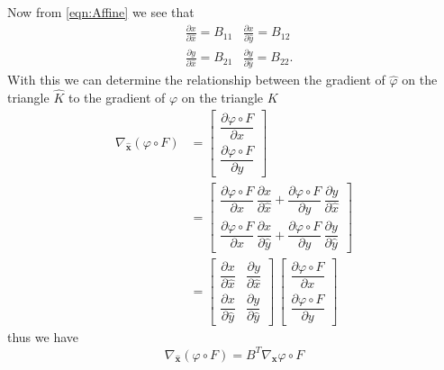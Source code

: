 Now from \eqref{eqn:Affine} we see that
\begin{align*}
  &\frac{\partial x}{\partial \hat{x}} = B_{11}   &\frac{\partial x}{\partial \hat{y}} = B_{12} \\
  &\frac{\partial y}{\partial \hat{x}} = B_{21}   &\frac{\partial y}{\partial
    \hat{y}} = B_{22}.
\end{align*}
With this we can determine the relationship between the gradient of $\hat{\varphi}$ on the
triangle $\hat{K}$ to the gradient of $\varphi$ on the triangle $K$
\begin{align*}
  \nabla_{\mathbf{\hat{x}}}\left( \varphi \circ F \right) &= \begin{bmatrix}
    \dfrac{\partial \varphi\circ F}{\partial \hat{x}} \\[1em]
    \dfrac{\partial \varphi\circ F}{\partial \hat{y}}
  \end{bmatrix} \\
  &=\begin{bmatrix}
    \dfrac{\partial \varphi\circ F}{\partial x} \, \dfrac{\partial x}{\partial \hat{x}} +
      \dfrac{\partial \varphi\circ F}{\partial y} \, \dfrac{\partial y}{\partial \hat{x}} \\[1em]
    \dfrac{\partial \varphi\circ F}{\partial x} \, \dfrac{\partial x}{\partial \hat{y}} +
      \dfrac{\partial \varphi\circ F}{\partial y} \, \dfrac{\partial y}{\partial \hat{y}}
  \end{bmatrix} \\
  &= \begin{bmatrix}
    \dfrac{\partial x}{\partial \hat{x}} & \dfrac{\partial y}{\partial \hat{x}} \\[1em]
    \dfrac{\partial x}{\partial \hat{y}} & \dfrac{\partial y}{\partial \hat{y}}
  \end{bmatrix}\, \begin{bmatrix}
    \dfrac{\partial \varphi\circ F}{\partial x} \\[1em] \dfrac{\partial \varphi\circ F}{\partial y}
  \end{bmatrix}
\end{align*}
thus we have
\begin{equation}
  \nabla_{\mathbf{\hat{x}}}\left( \varphi \circ F \right) = B^T \nabla_{\mathbf{x}} \varphi \circ F
  \label{eqn:Gradient}
\end{equation}

